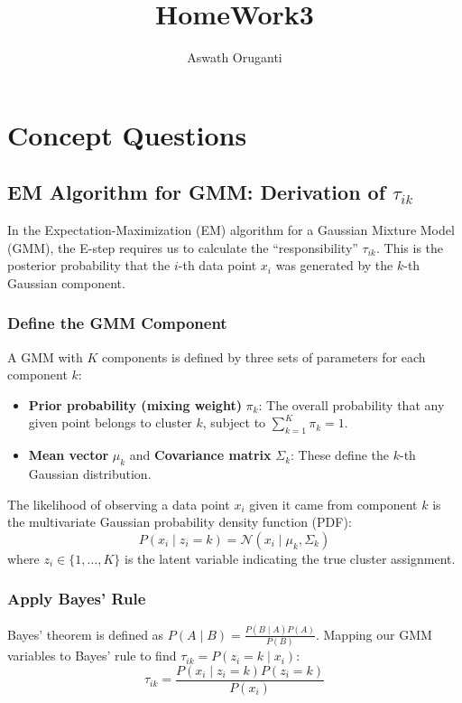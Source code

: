 \documentclass[twoside, 10pt]{article}
\begin{document}
\title{\textbf{\Large HomeWork3}}
\author{Aswath Oruganti}
\maketitle

\section{Concept Questions}


\subsection{EM Algorithm for GMM: Derivation of $\tau_{ik}$}
In the Expectation-Maximization (EM) algorithm for a Gaussian Mixture Model (GMM), the E-step requires us to calculate the ``responsibility'' $\tau_{ik}$. This is the posterior probability that the $i$-th data point $x_i$ was generated by the $k$-th Gaussian component.

\subsubsection{Define the GMM Component} %
A GMM with $K$ components is defined by three sets of parameters for each component $k$:
\begin{itemize}
    \item \textbf{Prior probability (mixing weight)} $\pi_k$: The overall probability that any given point belongs to cluster $k$, subject to $\sum_{k=1}^K \pi_k = 1$.
    \item \textbf{Mean vector} $\mu_k$ and \textbf{Covariance matrix} $\Sigma_k$: These define the $k$-th Gaussian distribution.
\end{itemize}

The likelihood of observing a data point $x_i$ given it came from component $k$ is the multivariate Gaussian probability density function (PDF):
\[P(x_i \mid z_i = k) = \mathcal{N}(x_i \mid \mu_k, \Sigma_k)\]
where $z_i \in \{1, \dots, K\}$ is the latent variable indicating the true cluster assignment.

\subsubsection{Apply Bayes' Rule} %
Bayes' theorem is defined as $P(A \mid B) = \frac{P(B \mid A) P(A)}{P(B)}$. Mapping our GMM variables to Bayes' rule to find $\tau_{ik} = P(z_i = k \mid x_i)$:
\[\tau_{ik} = \frac{P(x_i \mid z_i = k) P(z_i = k)}{P(x_i)}\]
\end{document}
